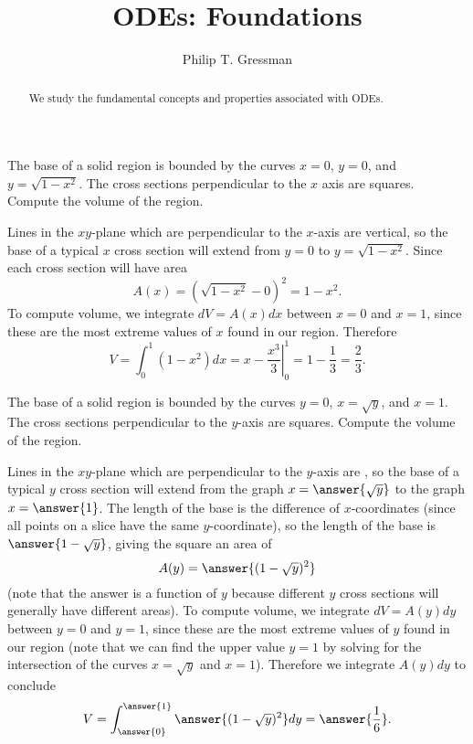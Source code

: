 \documentclass{ximera}
\title{ODEs: Foundations}
\author{Philip T. Gressman}
\begin{document}
\begin{abstract}
We study the fundamental concepts and properties associated with ODEs.
\end{abstract}
\maketitle

\begin{example}
The base of a solid region is bounded by the curves $x = 0$, $y= 0$, and $y = \sqrt{1-x^2}$. The cross sections perpendicular to the $x$ axis are squares. Compute the volume of the region.
\begin{solution}
Lines in the $xy$-plane which are perpendicular to the $x$-axis are vertical, so the base of a typical $x$ cross section will extend from $y=0$ to $y = \sqrt{1-x^2}$. Since each cross section will have area
\[ A(x) = \left( \sqrt{1-x^2} - 0 \right)^2 = 1-x^2. \]
To compute volume, we integrate $dV = A(x) dx$ between $x=0$ and $x=1$, since these are the most extreme values of $x$ found in our region. Therefore
\[ V = \int_0^1 ( 1 -x^2) dx = \left. x - \frac{x^3}{3} \right|_0^1 = 1 - \frac{1}{3} = \frac{2}{3}. \]
\end{solution}
\end{example}

\begin{example}
The base of a solid region is bounded by the curves $y = 0$, $x = \sqrt{y}$, and $x = 1$. The cross sections perpendicular to the $y$-axis are squares. Compute the volume of the region.
\begin{solution}
Lines in the $xy$-plane which are perpendicular to the $y$-axis are , so the base of a typical $y$ cross section will extend from the graph $x=\answer{\sqrt{y}}$ to the graph $x = \answer{1}$. The length of the base is the difference of $x$-coordinates (since all points on a slice have the same $y$-coordinate), so the length of the base is $\answer{1 - \sqrt{y}}$, giving the square an area of 
\[ A(y) = \answer{(1-\sqrt{y})^2} \]
(note that the answer is a function of $y$ because different $y$ cross sections will generally have different areas).
To compute volume, we integrate $dV = A(y) dy$ between $y=0$ and $y=1$, since these are the most extreme values of $y$ found in our region (note that we can find the upper value $y=1$ by solving for the intersection of the curves $x = \sqrt{y}$ and $x=1$). Therefore we integrate $A(y) dy$ to conclude
\[ V = \int_{\answer{0}}^{\answer{1}} \answer{(1-\sqrt{y})^2} dy = \answer{\frac{1}{6}}. \]
\end{solution}
\end{example}
\end{document}
